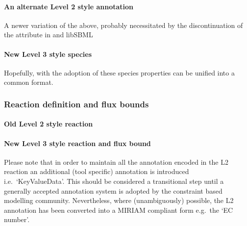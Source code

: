 \paragraph{An alternate \SBML Level 2 style annotation}
A newer variation of the above, probably necessitated by the discontinuation of the  attribute in \SBML and \textsf{libSBML}
%

\paragraph{New \SBML Level 3 style species}
Hopefully, with the adoption of \SBML \FBC these species properties can be unified into a common format.
%


\newpage
\subsubsection*{Reaction definition and flux bounds}
\paragraph{Old \SBML Level 2 style reaction}
\newpage
\paragraph{New \SBML Level 3 style reaction and flux bound}
Please note that in order to maintain all the annotation encoded in the \SBML L2 reaction  an additional (tool specific) annotation is introduced i.e.~`KeyValueData'. This should be considered a transitional step until a generally accepted annotation system is adopted by the constraint based modelling community. Nevertheless, where (unambiguously) possible, the L2 annotation has been converted into a MIRIAM compliant form e.g.~the `EC number'.

